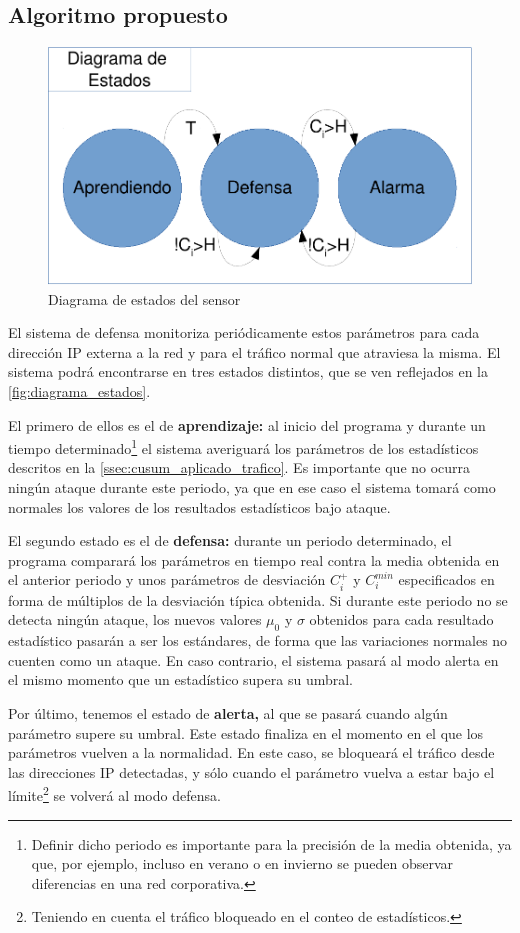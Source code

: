 \subsection{Algoritmo propuesto}
\begin{figure}[htbp]
\centering
\includegraphics[width=0.8\columnwidth]{CapituloCusum/Figuras/DiagramaEstados-crop}
\caption{Diagrama de estados del sensor}
\label{fig:diagrama_estados} 
\end{figure}

El sistema de defensa \redborderddos monitoriza periódicamente estos parámetros
para cada dirección IP externa a la red y para el tráfico normal que atraviesa
la misma. El sistema podrá encontrarse en tres estados distintos, que se ven reflejados
en la \autoref{fig:diagrama_estados}.

El primero de ellos es el de \textbf{aprendizaje:} al
inicio del programa y durante un tiempo determinado\footnote{Definir dicho
periodo es importante para la precisión de la media obtenida, ya que, por ejemplo, incluso en
verano o en invierno se pueden observar diferencias en una red corporativa.}
el sistema averiguará los parámetros de los estadísticos descritos en la 
\autoref{ssec:cusum_aplicado_trafico}. Es importante que no ocurra ningún
ataque durante este periodo, ya que en ese caso el sistema tomará como normales
los valores de los resultados estadísticos bajo ataque. %

El segundo estado es el de \textbf{defensa:} durante un periodo determinado, el programa comparará
los parámetros en tiempo real contra la media obtenida en el anterior periodo y
unos parámetros de desviación $C_i^+$ y $C_i^{min}$ especificados en forma de múltiplos
de la desviación típica obtenida. Si durante este periodo no se detecta ningún ataque, los nuevos
valores $\mu_0$ y $\sigma$ obtenidos para cada resultado estadístico pasarán a ser los estándares, de
forma que las variaciones normales no cuenten como un ataque. En caso contrario, el sistema pasará al modo alerta en el mismo
momento que un estadístico supera su umbral. %

Por último, tenemos el estado de \textbf{alerta,} al que se pasará cuando algún parámetro supere su umbral. Este estado finaliza en el
momento en el que los parámetros vuelven a la normalidad. En este caso, se bloqueará el tráfico desde
las direcciones IP detectadas, y sólo cuando el parámetro vuelva a estar bajo el límite\footnote{Teniendo
en cuenta el tráfico bloqueado en el conteo de estadísticos.} se volverá al modo defensa.

\endinput
